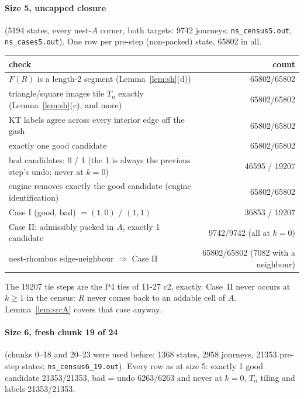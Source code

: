 \documentclass[11pt]{article}
\theoremstyle{definition}\newtheorem{definition}[theorem]{Definition}\newtheorem{remark}[theorem]{Remark}
\begin{document}
\paragraph{Size 5, uncapped closure} (5194 states, every nest-$A$ corner, both targets: 9742 journeys; \texttt{ns\_census5.out}, \texttt{ns\_cases5.out}). One row per pre-step (non-packed) state, 65802 in all.
\begin{center}\small\begin{tabular}{lr}\toprule
check & count\\\midrule
$F(R)$ is a length-2 segment (Lemma~\ref{lem:sh}(d)) & 65802/65802\\
triangle/square images tile $T_n$ exactly (Lemma~\ref{lem:sh}(c), and more) & 65802/65802\\
KT labels agree across every interior edge off the gash & 65802/65802\\
exactly one good candidate & 65802/65802\\
bad candidates: 0 / 1 (the 1 is always the previous step's undo; never at $k=0$) & 46595 / 19207\\
engine removes exactly the good candidate (engine identification) & 65802/65802\\
Case I (good, bad) $=(1,0)$ / $(1,1)$ & 36853 / 19207\\
Case II: admissibly packed in $A$, exactly 1 candidate & 9742/9742 (all at $k=0$)\\
nest-rhombus edge-neighbour $\Rightarrow$ Case II & 65802/65802 (7082 with a neighbour)\\\bottomrule
\end{tabular}\end{center}
The 19207 tie steps are the P4 ties of 11-27 c2, exactly. Case~II never occurs at $k\ge1$ in the census: $R$ never comes back to an addable cell of $A$. Lemma~\ref{lem:srcA} covers that case anyway.
\paragraph{Size 6, fresh chunk 19 of 24} (chunks 0--18 and 20--23 were used before; 1368 states, 2958 journeys, 21353 pre-step states; \texttt{ns\_census6\_19.out}). Every row as at size 5: exactly 1 good candidate 21353/21353, bad = undo 6263/6263 and never at $k=0$, $T_n$ tiling and labels 21353/21353.
\end{document}
